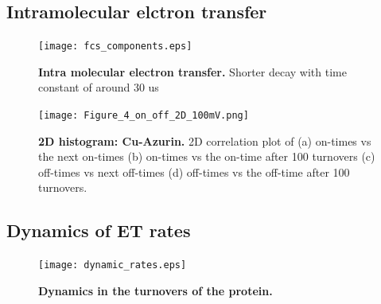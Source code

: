 \subsection{Intramolecular elctron transfer}
\begin{figure}
	\centering
	\texttt{[image: fcs\_components.eps]}
	\caption{\textbf{Intra molecular electron transfer.} Shorter decay with time constant of around 30 us}
	\label{fig:fcs_components}
\end{figure}
\begin{figure}
	\centering
	\texttt{[image: Figure\_4\_on\_off\_2D\_100mV.png]}
	\caption{\textbf{2D histogram: Cu-Azurin.} 2D correlation plot of (a) on-times vs the next on-times (b) on-times vs the on-time after 100 turnovers (c) off-times vs next off-times (d) off-times vs the off-time after 100 turnovers.}
	\label{fig:onoff2D}
\end{figure}
\subsection{Dynamics of ET rates}
\begin{figure}
	\centering
	\texttt{[image: dynamic\_rates.eps]}
	\caption{\textbf{Dynamics in the turnovers of the protein.}}
	\label{fig:dynamic_rates}
\end{figure}

